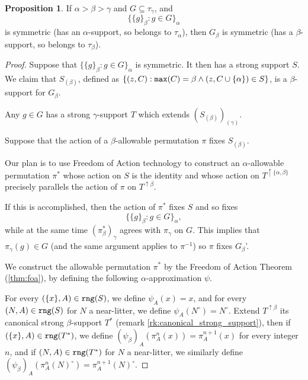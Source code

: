 \documentclass[112pt]{article}
\theoremstyle{definition}
\newtheorem{proposition}[theorem]{Proposition}
\theoremstyle{remark}
\newcommand{\rk}[1]{{\color{blue}\sl #1}}
\begin{document}
\begin{proposition}\label{prop:unions_of_singletons}
If  $\alpha>\beta>\gamma$ and $G \subseteq \tau_\gamma$, and $$\{\{g\}_\beta:g \in G\}_\alpha$$ is symmetric (has an $\alpha$-support, so belongs to $\tau_\alpha$), then $G_\beta$ is symmetric (has a $\beta$-support, so belongs to $\tau_\beta$).
\end{proposition}
\begin{proof}
Suppose that $\{\{g\}_\beta:g \in G\}_\alpha$ is symmetric.  It then has a strong support $S$.  We claim that $S_{(\beta)}$, defined as $\{(z,C): {\tt max}(C)=\beta \wedge (z,C\cup \{\alpha\}) \in S\}$,  is a $\beta$-support for $G_\beta$.

Any $g \in G$ has a strong $\gamma$-support $T$ which extends $(S_{(\beta)})_{(\gamma)}$.

Suppose that the action of a $\beta$-allowable permutation $\pi$ fixes $S_{(\beta)}$.

Our plan is to use Freedom of Action technology to construct an $\alpha$-allowable permutation $\pi^*$ whose action on $S$ is the identity
and whose action on $T^{\uparrow\{\alpha,\beta\}}$ precisely parallels the action of $\pi$ on $T^{\uparrow\beta}$. %

If this is accomplished, then the action of $\pi^*$ fixes $S$ and so fixes $$\{\{g\}_\beta:g \in G\}_\alpha,$$ while at the same
time $(\pi^*_\beta)_\gamma$ agrees with $\pi_\gamma$ on $G$.  This implies that $\pi_\gamma(g) \in G$ (and the same argument applies to $\pi^{-1}$)
so $\pi$ fixes $G_\beta$'.

We construct the allowable permutation $\pi^*$ by the Freedom of Action Theorem (\ref{thm:foa}), by defining the following $\alpha$-approximation $\psi$.

For every $(\{x\},A) \in {\tt rng}(S)$, we define $\psi_A(x) = x$, and for every $(N,A) \in {\tt rng}(S)$ for $N$ a near-litter, we define $\psi_A(N^\circ) = N^\circ$.
Extend $T^{\uparrow\beta}$ its canonical strong $\beta$-support $T^*$ {(remark \ref{rk:canonical_strong_support})}, then if $(\{x\},A) \in {\tt rng}(T^*)$, we define $(\psi_\beta)_A(\pi^n_A(x)) = \pi^{n+1}_A(x)$ for every integer $n$, and if $(N,A) \in {\tt rng}(T^*)$ for $N$ a near-litter, we similarly define $(\psi_\beta)_A(\pi^n_A(N)^\circ) = \pi^{n+1}_A(N)^\circ$.


\end{proof}
\end{document}
